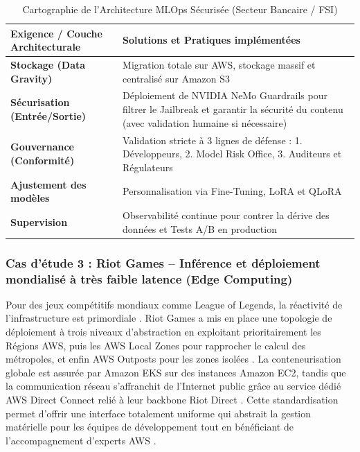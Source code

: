 \begin{table}[H]
\centering
\caption{Cartographie de l'Architecture MLOps Sécurisée (Secteur Bancaire / FSI)}
\label{tab:capitalone_mapping}
\renewcommand{\arraystretch}{1.3}
\begin{tabular}{|p{4.5cm}|p{10cm}|}
\hline
\rowcolor{darkgreen!20} \textbf{Exigence / Couche Architecturale} & \textbf{Solutions et Pratiques implémentées} \\ \hline
\textbf{Stockage (Data Gravity)} & Migration totale sur AWS, stockage massif et centralisé sur Amazon S3 \cite{77} \\ \hline
\textbf{Sécurisation (Entrée/Sortie)} & Déploiement de NVIDIA NeMo Guardrails pour filtrer le Jailbreak et garantir la sécurité du contenu (avec validation humaine si nécessaire) \cite{77} \\ \hline
\textbf{Gouvernance (Conformité)} & Validation stricte à 3 lignes de défense : 1. Développeurs, 2. Model Risk Office, 3. Auditeurs et Régulateurs \cite{77} \\ \hline
\textbf{Ajustement des modèles} & Personnalisation via Fine-Tuning, LoRA et QLoRA \cite{77} \\ \hline
\textbf{Supervision} & Observabilité continue pour contrer la dérive des données et Tests A/B en production \cite{77} \\ \hline
\end{tabular}
\end{table}



\subsubsection{Cas d'étude 3 : Riot Games -- Inférence et déploiement mondialisé à très faible latence (Edge Computing)}
Pour des jeux compétitifs mondiaux comme League of Legends, la réactivité de l'infrastructure est primordiale \cite{87}. Riot Games a mis en place une topologie de déploiement à trois niveaux d'abstraction en exploitant prioritairement les Régions AWS, puis les AWS Local Zones pour rapprocher le calcul des métropoles, et enfin AWS Outposts pour les zones isolées \cite{87}. La conteneurisation globale est assurée par Amazon EKS sur des instances Amazon EC2, tandis que la communication réseau s'affranchit de l'Internet public grâce au service dédié AWS Direct Connect relié à leur backbone Riot Direct \cite{87}. Cette standardisation permet d'offrir une interface totalement uniforme qui abstrait la gestion matérielle pour les équipes de développement tout en bénéficiant de l'accompagnement d'experts AWS \cite{87}.

